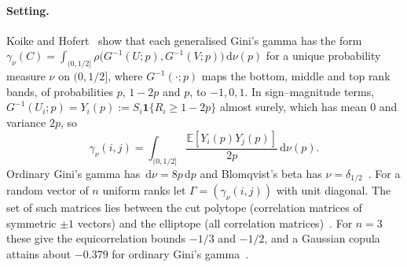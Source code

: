 \documentclass[11pt,a4paper]{article}
\theoremstyle{remark}
\newcommand{\EE}{\mathbb{E}}
\newcommand{\dd}{\,\mathrm d}
\newcommand{\ind}{\mathbf 1}
\begin{document}
\paragraph{Setting.} Koike and Hofert~\cite[Theorem~3]{kh} show that each generalised Gini's gamma has the form $\gamma_\nu(C)=\int_{(0,1/2]}\rho\big(G^{-1}(U;p),G^{-1}(V;p)\big)\dd\nu(p)$ for a unique probability measure $\nu$ on $(0,1/2]$, where $G^{-1}(\cdot;p)$ maps the bottom, middle and top rank bands, of probabilities $p$, $1-2p$ and $p$, to $-1,0,1$. In sign--magnitude terms, $G^{-1}(U_i;p)=Y_i(p):=S_i\ind\{R_i\geq1-2p\}$ almost surely, which has mean $0$ and variance $2p$, so
\[
 \gamma_\nu(i,j)=\int_{(0,1/2]}\frac{\EE[Y_i(p)Y_j(p)]}{2p}\dd\nu(p).
\]
Ordinary Gini's gamma has $\dd\nu=8p\dd p$ and Blomqvist's beta has $\nu=\delta_{1/2}$~\cite[Example~4]{kh}. For a random vector of $n$ uniform ranks let $\Gamma=(\gamma_\nu(i,j))$ with unit diagonal. The set of such matrices lies between the cut polytope (correlation matrices of symmetric $\pm1$ vectors) and the elliptope (all correlation matrices)~\cite[Proposition~5]{kh}. For $n=3$ these give the equicorrelation bounds $-1/3$ and $-1/2$, and a Gaussian copula attains about $-0.379$ for ordinary Gini's gamma~\cite[Example~5]{kh}.
\end{document}
